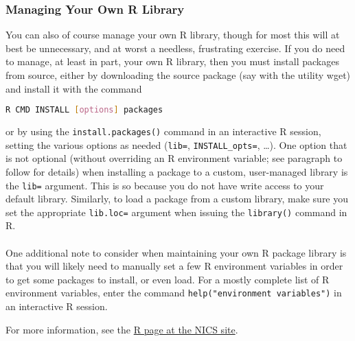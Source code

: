 \subsubsection{Managing Your Own R Library}
You can also of course manage your own R library, though for most this will at best be unnecessary, and at worst a needless, frustrating exercise.  If you do need to manage, at least in part, your own R library, then you must install packages from source, either by downloading the source package (say with the utility wget) and install it with the command
\begin{lstlisting}[language=sh]
R CMD INSTALL [options] packages
\end{lstlisting}%
or by using the \texttt{install.packages()} command in an interactive R session, setting the various options as needed (\texttt{lib=}, \texttt{INSTALL\_opts=}, \dots).  One option that is not optional (without overriding an R environment variable; see paragraph to follow for details) when installing a package to a custom, user-managed library is the \texttt{lib=} argument.  This is so because you do not have write access to your default library.  Similarly, to load a package from a custom library, make sure you set the appropriate \texttt{lib.loc=} argument when issuing the \texttt{library()} command in R.\\\\
%
One additional note to consider when maintaining your own R package library is that you will likely need to manually set a few R environment variables in order to get some packages to install, or even load.  For a mostly complete list of R environment variables, enter the command \texttt{help("environment variables")} in an interactive R session.

For more information, see the \href{http://www.nics.tennessee.edu/computing-resources/nautilus/software?&software=r}{R page at the NICS site}.

